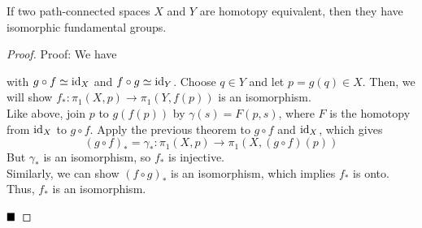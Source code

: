 \begin{theorem}
    If two path-connected spaces $X$ and $Y$ are homotopy equivalent, then they have isomorphic fundamental groups.
\end{theorem}
\begin{proof}{Proof:}
    We have
    \begin{center}
    \end{center}
    with $g \circ f \simeq \text{id}_X$ and $f \circ g \simeq \text{id}_Y$. Choose $q \in Y$ and let $p = g(q) \in X$. Then, we will show $f_* : \pi_1(X, p) \to \pi_1(Y, f(p))$ is an isomorphism.\\

    Like above, join $p$ to $g(f(p))$ by $\gamma(s) = F(p, s)$, where $F$ is the homotopy from $\text{id}_{X}$ to $g \circ f$. Apply the previous theorem to $g \circ f$ and $\text{id}_X$, which gives
    \[ (g \circ f)_* = \gamma_* : \pi_1(X, p) \to \pi_1(X, (g \circ f)(p)) \]
    But $\gamma_*$ is an isomorphism, so $f_*$ is injective.\\


    Similarly, we can show $(f \circ g)_*$ is an isomorphism, which implies $f_*$ is onto. Thus, $f_*$ is an isomorphism.

    $\qed$
\end{proof}

